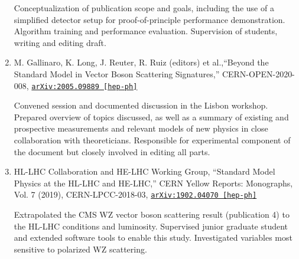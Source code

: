 \documentclass[10pt]{res} %
\begin{document}
\begin{resume}
\begin{enumerate}
    Conceptualization of publication scope and goals, including the use of a simplified detector setup for proof-of-principle performance demonstration.
    Algorithm training and performance evaluation. Supervision of students, writing and editing draft.

  \item M. Gallinaro, K. Long, J. Reuter, R. Ruiz (editors) et al.,``Beyond the Standard Model in Vector Boson Scattering Signatures,''
    CERN-OPEN-2020-008, \href{https://arxiv.org/abs/2005.09889}{\texttt{arXiv:2005.09889 [hep-ph]}}

    Convened session and documented discussion in the Lisbon workshop.
    Prepared overview of topics discussed, as well as a summary of existing and prospective measurements and relevant models of new physics in 
    close collaboration with theoreticians. 
    Responsible for experimental component of the document but closely involved in editing all parts.
  \item HL-LHC Collaboration and HE-LHC Working Group, ``Standard Model Physics at the HL-LHC and HE-LHC,''
    CERN Yellow Reports: Monographs, Vol. 7 (2019), CERN-LPCC-2018-03, \href{https://arxiv.org/abs/1902.04070}{\texttt{arXiv:1902.04070 [hep-ph]}}

    Extrapolated the CMS WZ vector boson scattering result (publication 4) to the HL-LHC conditions and luminosity. Supervised junior
    graduate student and extended software tools to enable this study. Investigated variables most sensitive to 
    polarized WZ scattering.
\end{enumerate}

\end{resume}
\end{document}
